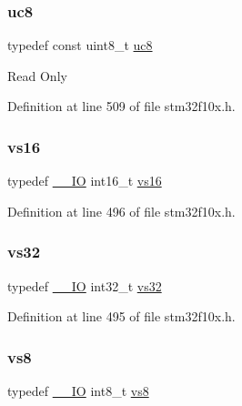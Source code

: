 \subsubsection{\texorpdfstring{uc8}{uc8}}
{\footnotesize\ttfamily typedef const uint8\+\_\+t \hyperlink{group___exported__types_gac74022c74a461f810e0d4fdc9bfea480}{uc8}}

Read Only 

Definition at line 509 of file stm32f10x.\+h.

\mbox{\label{group___exported__types_ga19c9450d60abff7c6d3d35f31c10f83e}} 
\subsubsection{\texorpdfstring{vs16}{vs16}}
{\footnotesize\ttfamily typedef \hyperlink{core__sc300_8h_aec43007d9998a0a0e01faede4133d6be}{\+\_\+\+\_\+\+IO} int16\+\_\+t \hyperlink{group___exported__types_ga19c9450d60abff7c6d3d35f31c10f83e}{vs16}}



Definition at line 496 of file stm32f10x.\+h.

\mbox{\label{group___exported__types_ga476e2cb441f8e689433350ae2eeee510}} 
\subsubsection{\texorpdfstring{vs32}{vs32}}
{\footnotesize\ttfamily typedef \hyperlink{core__sc300_8h_aec43007d9998a0a0e01faede4133d6be}{\+\_\+\+\_\+\+IO} int32\+\_\+t \hyperlink{group___exported__types_ga476e2cb441f8e689433350ae2eeee510}{vs32}}



Definition at line 495 of file stm32f10x.\+h.

\mbox{\label{group___exported__types_ga9e5a203f00d2906af9466f68b4e72277}} 
\subsubsection{\texorpdfstring{vs8}{vs8}}
{\footnotesize\ttfamily typedef \hyperlink{core__sc300_8h_aec43007d9998a0a0e01faede4133d6be}{\+\_\+\+\_\+\+IO} int8\+\_\+t \hyperlink{group___exported__types_ga9e5a203f00d2906af9466f68b4e72277}{vs8}}



